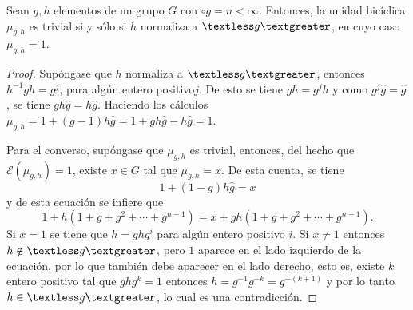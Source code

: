 \begin{proposicion}\label{prop:unidadesb}
Sean $g,h$ elementos de un grupo $G$ con $\circ g = n < \infty$. Entonces, la unidad bicíclica $\mu_{g,h}$ es trivial si y sólo si $h$ normaliza a $\textless g \textgreater$, en cuyo caso $\mu_{g,h} = 1$.
\end{proposicion}
\begin{proof}
Supóngase que $h$ normaliza a $\textless g \textgreater$, entonces $h^{-1}gh = g^j$, para algún entero positivo$j$. De esto se tiene $gh = g^jh$ y como $g^j\hat{g} = \hat{g}$, se tiene $gh\hat{g} = h\hat{g}$. Haciendo los cálculos $\mu_{g,h} = 1+(g-1)h\hat{g}= 1+gh\hat{g}-h\hat{g} =1$.

Para el converso, supóngase que $\mu_{g,h}$ es trivial, entonces, del hecho que $\mathcal{E}(\mu_{g,h})=1$, existe $x \in G$ tal que $\mu_{g,h}=x$. De esta cuenta, se tiene
\[ 1+(1-g)h\hat{g} = x \] y de esta ecuación se infiere que \[ 1+ h(1+g+g^2+\cdots + g^{n-1}) = x +gh(1+g+g^2+\cdots+g^{n-1}).  \] Si $x=1$ se tiene que $h=ghg^i$ para algún entero positivo $i$. Si $x \neq 1$ entonces $h \notin \textless g \textgreater$, pero $1$ aparece en el lado izquierdo de la ecuación, por lo que también debe aparecer en el lado derecho, esto es, existe $k$ entero positivo tal que $ghg^k = 1$ entonces $h = g^{-1}g^{-k}= g^{-(k+1)}$ y por lo tanto $h \in \textless g \textgreater$, lo cual es una contradicción. 
\end{proof}